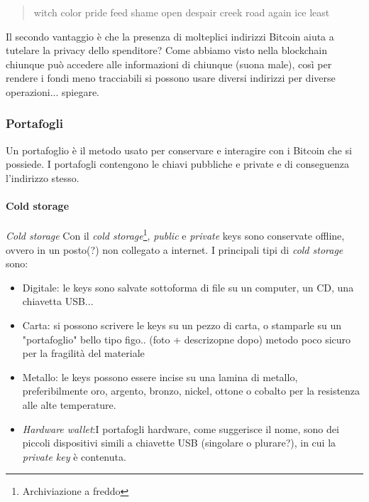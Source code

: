 \documentclass {article}
\begin{document}
\begin{quote}

witch color pride feed shame open despair creek road again ice least

\end{quote}
%
Il secondo vantaggio è che la presenza di molteplici indirizzi Bitcoin aiuta a tutelare la privacy dello spenditore?
Come abbiamo visto nella blockchain chiunque può accedere alle informazioni di chiunque (suona male), così per rendere i fondi meno tracciabili si possono usare diversi indirizzi per diverse operazioni... spiegare.


\subsubsection {Portafogli}


Un portafoglio è il metodo usato per conservare e interagire con i Bitcoin che si possiede.
I portafogli contengono le chiavi pubbliche e private e di conseguenza l'indirizzo stesso.


\paragraph {Cold storage}


\textit{Cold storage} Con il \textit{cold storage}\footnote{Archiviazione a freddo}, \textit{public} e \textit{private} keys sono conservate offline, ovvero in un posto(?) non collegato a internet.
I principali tipi di \textit{cold storage} sono:

\begin{itemize}
\item Digitale: le keys sono salvate sottoforma di file su un computer, un CD, una chiavetta USB...
\item Carta: si possono scrivere le keys su un pezzo di carta, o stamparle su un "portafoglio" bello tipo figo.. (foto + descrizopne dopo) metodo poco sicuro per la fragilità del materiale
\item Metallo: le keys possono essere incise su una lamina di metallo, preferibilmente oro, argento, bronzo, nickel, ottone o cobalto per la resistenza alle alte temperature.
\item \textit{Hardware wallet}:I portafogli hardware, come suggerisce il nome, sono dei piccoli dispositivi simili a chiavette USB (singolare o plurare?), in cui la \textit{private key} è contenuta.
\end{itemize}
\end{document}
